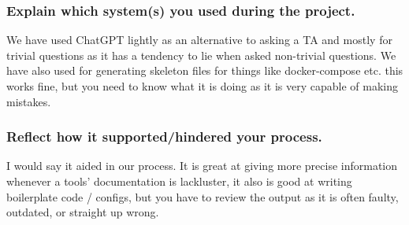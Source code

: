 \subsubsection{Explain which system(s) you used during the project.}
We have used ChatGPT lightly as an alternative to asking a TA and mostly for trivial questions as it has a tendency to lie when asked non-trivial questions.
We have also used for generating skeleton files for things like docker-compose etc. this works fine, but you need to know what it is doing as it is very capable of making mistakes.
\subsubsection{Reflect how it supported/hindered your process.}
I would say it aided in our process. It is great at giving more precise information whenever a tools' documentation is lackluster, it also is good at writing boilerplate code / configs, but you have to review the output as it is often faulty, outdated, or straight up wrong.